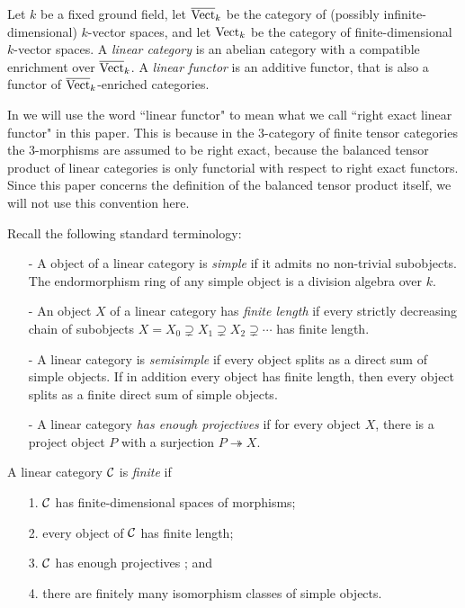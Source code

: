 \documentclass{amsart}
\begin{document}
	Let $k$ be a fixed ground field, let $\overline{\mathrm{Vect}}_k$ be the category of (possibly infinite-dimensional) $k$-vector spaces, and let $\mathrm{Vect}_k$ be the category of finite-dimensional $k$-vector spaces.   A {\em linear category} is an abelian category with a compatible enrichment over $\overline{\mathrm{Vect}}_k$. 
A {\em linear functor} is an additive functor, that is also a functor of $\overline{\mathrm{Vect}}_k$-enriched categories. 

\begin{warning}
	In \cite{3TC, DTCI} we will use the word ``linear functor" to mean what we call ``right exact linear functor" in this paper.  This is because in the $3$-category of finite tensor categories the $3$-morphisms are assumed to be right exact, because the balanced tensor product of linear categories is only functorial with respect to right exact functors.  Since this paper concerns the definition of the balanced tensor product itself, we will not use this convention here.
\end{warning}

Recall the following standard terminology:
\begin{itemize}
	\item[-] A object of a linear category is {\em simple} if it admits no non-trivial subobjects. The endormorphism ring of any simple object is a division algebra over $k$. 
	\item[-] An object $X$ of a linear category has {\em finite length} if every strictly decreasing chain of subobjects $X = X_0 \supsetneq X_1 \supsetneq X_2 \supsetneq  \cdots$ has finite length. 
	\item[-] A linear category is {\em semisimple} if every object splits as a direct sum of simple objects. If in addition every object has finite length, then every object splits as a finite direct sum of simple objects.
	\item[-] A linear category {\em has enough projectives} if for every object $X$, there is a project object $P$ with a surjection $P \twoheadrightarrow X$. 
\end{itemize}


\begin{definition} %
	A linear category $\mathcal C$ is {\em finite} if 
	\begin{enumerate}
		\item[1.] $\mathcal C$ has finite-dimensional spaces of morphisms;
		\item[2.] every object of $\mathcal C$ has finite length;
		\item[3.] $\mathcal C$ has enough projectives%
		; and
		\item[4.] there are finitely many isomorphism classes of simple objects.  
	\end{enumerate}
\end{definition}
\end{document}
